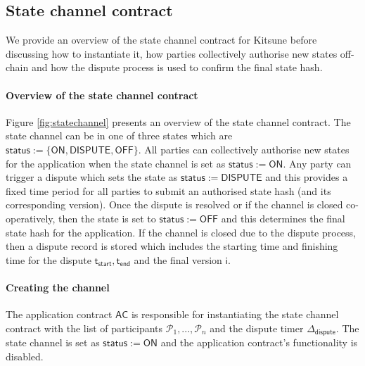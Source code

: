 \documentclass{llncs}
\newcommand{\chanstatus}{\mathsf{status}}
\newcommand{\chanon}{\mathsf{ON}}
\newcommand{\chandispute}{\mathsf{DISPUTE}}
\newcommand{\chanoff}{\mathsf{OFF}}
\newcommand{\hstatei}{\mathsf{hstate}_{\monotoniccounter}}
\newcommand{\monotoniccounter}{\mathsf{i}}
\newcommand{\stateinfoi}{\mathsf{state}_{\mathsf{i}}}
\newcommand{\participant}{\mathcal{P}}
\newcommand{\rani}{\mathsf{r}_{\mathsf{i}}}
\newcommand{\ran}{\mathsf{r}}
\newcommand{\statechannel}{\mathsf{SC}}
\newcommand{\sign}{\mathsf{Sign}}
\newcommand{\appcontract}{\mathsf{AC}}
\newcommand{\timerdispute}{\mathsf{\Delta}_{\mathsf{dispute}}}
\newcommand{\timestart}{\mathsf{t}_{\mathsf{start}}}
\newcommand{\timeend}{\mathsf{t}_{\mathsf{end}}}
\begin{document}
	\subsection{State channel contract}
	
	We provide an overview of the state channel contract for \textsf{Kitsune} before discussing how to instantiate it,  how parties collectively authorise new states off-chain and how the dispute process is used to confirm the final state hash. 
	
	\paragraph{Overview of the state channel contract} 
	Figure \ref{fig:statechannel} presents an overview of the state channel contract.
	The state channel can be in one of three states which are $\chanstatus := \{\chanon, \chandispute, \chanoff\}$.
	All parties can collectively authorise new states for the application when the state channel is set as $\chanstatus := \chanon$.
	Any party can trigger a dispute which sets the state as $\chanstatus := \chandispute$ and this provides a fixed time period for all parties to submit an authorised state hash (and its corresponding version).
	Once the dispute is resolved or if the channel is closed co-operatively, then the state is set to $\chanstatus := \chanoff$ and this determines the final state hash for the application. 
	If the channel is closed due to the dispute process, then a dispute record is stored which includes the starting time and finishing time for the dispute $\timestart, \timeend$ and the final version $\monotoniccounter$.
	
	\paragraph{Creating the channel} 
	
	The application contract $\appcontract$ is responsible for instantiating the state channel contract with the list of participants $\participant_{1},...,\participant_{n}$ and the dispute timer $\timerdispute$.
	The state channel is set as $\chanstatus := \chanon$ and the application contract's functionality is disabled. 
	
	
\end{document}
